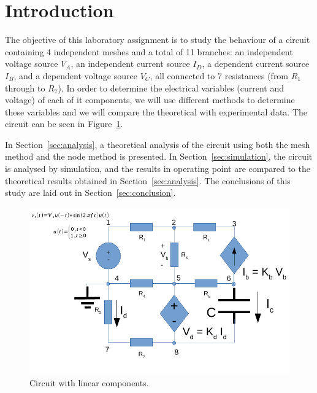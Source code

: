 \section{Introduction}
\label{sec:introduction}

The objective of this laboratory assignment is to study the behaviour of a circuit containing 4 independent meshes and a total of 11 branches: an independent voltage source $V_A$, an independent current source $I_D$, a dependent current source $I_B$, and a dependent voltage source $V_C$, all connected to 7 resistances (from $R_1$ through to $R_7$). In order to determine the electrical variables (current and voltage) of each of it components, we will use different methods to determine these variables and we will compare the theoretical with experimental data. The circuit can be seen in Figure~\ref{fig:rc}.

In Section~\ref{sec:analysis}, a theoretical analysis of the circuit using both the mesh method and the node method is
presented. In Section~\ref{sec:simulation}, the circuit is analysed by
simulation, and the results in operating point are compared to the theoretical results obtained in
Section~\ref{sec:analysis}. The conclusions of this study are laid out in
Section~\ref{sec:conclusion}.

\begin{figure}[h] \centering
\includegraphics[width=0.9\linewidth]{rc.pdf}
\caption{Circuit with linear components.}
\label{fig:rc}
\end{figure}

